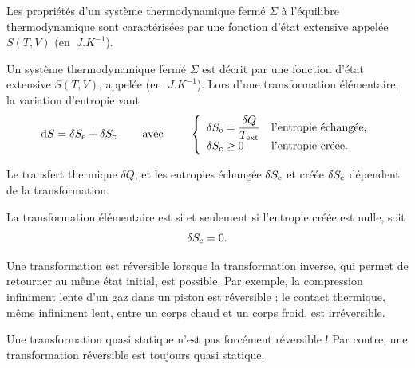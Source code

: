 \documentclass[12pt,fancy]{cours}
\begin{document}

\begin{definition}[Entropie]\label{form:1p}
  Les propriétés d’un système thermodynamique fermé $\Sigma$ à l’équilibre thermodynamique sont caractérisées par une fonction d’état extensive appelée  $S(T,V)$ (en $\SI{}{J.K^{-1}}$). 
\end{definition}


\begin{theorem}\label{form:1p}
  Un système thermodynamique fermé $\Sigma$ est décrit par une fonction d'état extensive $S(T,V)$, appelée  (en $\SI{}{J.K^{-1}}$). Lors d'une transformation élémentaire, la variation d'entropie vaut
\begin{equation*}
\mathrm{d} S = \delta S_{\rm e} + \delta S_{\rm c} \qquad\text{ avec }\qquad \left\{\begin{array}{ll}
\delta S_{\rm e} = \dfrac{\delta Q}{T_{\rm ext}} & \text{l'entropie échangée}, \\
\delta S_{\rm c} \geq 0 & \text{l'entropie créée}.
\end{array}\right.
\end{equation*}
\end{theorem}
\noindent Le transfert thermique $\delta Q$, et les entropies échangée $\delta S_{\rm e}$
et créée $\delta S_{\rm c}$ dépendent de la transformation.

\begin{definition}
La transformation élémentaire est  si et seulement si l'entropie créée est nulle, soit
$$
\delta S_{\rm c}=0.
$$
\end{definition}
\noindent Une transformation est réversible lorsque la transformation inverse, qui permet de retourner au même état initial, est possible. Par exemple, la compression infiniment lente d'un gaz dans un piston est réversible ; le contact thermique, même infiniment lent, entre un corps chaud et un corps froid, est irréversible.
\begin{danger}
  Une transformation quasi statique n'est pas forcément réversible ! Par contre, une transformation réversible est toujours quasi statique.
\end{danger}
\end{document}
